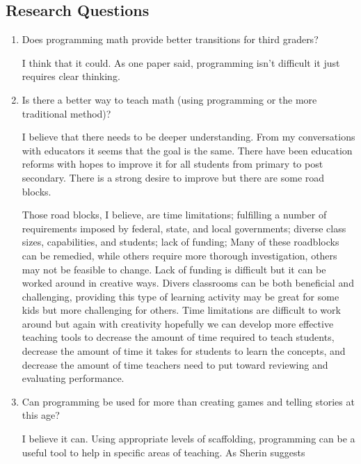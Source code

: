 \documentclass[12pt]{article}
\begin{document}
\subsection*{Research Questions}
\begin{enumerate}
	\item Does programming math provide better transitions for third graders?
	
	I think that it could. As one paper said, programming isn't difficult it just requires clear thinking. 

	\item Is there a better way to teach math (using programming or the more traditional method)? 
	
    I believe that there needs to be deeper understanding. From my conversations with educators it seems that the goal is the same. There have been education reforms with hopes to improve it for all students from primary to post secondary. There is a strong desire to improve but there are some road blocks. 
    
		Those road blocks, I believe, are time limitations; fulfilling a number of requirements imposed by federal, state, and local governments; diverse class sizes, capabilities, and students; lack of funding;
		Many of these roadblocks can be remedied, while others require more thorough investigation, others may not be feasible to change. Lack of funding is difficult but it can be worked around in creative ways. Divers classrooms can be both beneficial and challenging, providing this type of learning activity may be great for some kids but more challenging for others. Time limitations are difficult to work around but again with creativity hopefully we can develop more effective teaching tools to decrease the amount of time required to teach students, decrease the amount of time it takes for students to learn the concepts, and decrease the amount of time teachers need to put toward reviewing and evaluating performance.
	
	\item Can programming be used for more than creating games and telling stories at this age?
	
	I believe it can. Using appropriate levels of scaffolding, programming can be a useful tool to help in specific areas of teaching. As Sherin suggests
	

\end{enumerate}
\end{document}
